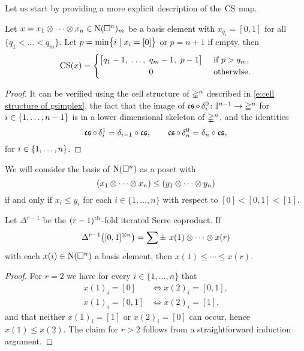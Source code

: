 Let us start by providing a more explicit description of the $\CS$ map.

\begin{lemma} \label{l:cs explicit}
	Let $x = x_1 \ot \cdots \ot x_n \in \chains(\cube^n)_m$ be a basis element with $x_{q_i} = [0,1]$ for all $\{q_1 < \dots < q_m\}$.
	Let $p = \min \set[\big]{i \mid x_i = [0]}$ or $p = n+1$ if empty, then
	\[
	\CS(x) =
	\begin{cases}
		\big[ q_1-1, \ \dots , \ q_m-1, \ p-1 \big] & \text{ if } p > q_m, \\
		\hfil 0 & \text{ otherwise}.
	\end{cases}
	\]
\end{lemma}

\begin{proof}
	It can be verified using the cell structure of $\gsimplex^n$ described in \cref{e:cell structure of gsimplex}, the fact that the image of $\cs \circ \, \delta^0_i \colon \gcube^{n-1} \to \gsimplex^n$ for $i \in \set{1,\dots,n-1}$ is in a lower dimensional skeleton of $\gsimplex^n$, and the identities
	\[
	\cs \circ \, \delta_i^1 = \delta_{i-1} \circ \cs,
	\qquad
	\cs \circ \, \delta_n^0 = \delta_n \circ \cs,
	\]
	for $i \in \set{1, \dots, n}$.
\end{proof}

We will consider the basis of $\chains(\cube^n)$ as a poset with
\[
(x_1 \ot \cdots \ot x_n) \leq (y_1 \ot \cdots \ot y_n)
\]
if and only if $x_i \leq y_i$ for each $i \in \{1, \dots, n\}$ with respect to $[0] < [0,1] < [1]$.

\begin{lemma}
	Let $\Delta^{r-1}$ be the $(r-1)^\th$-fold iterated Serre coproduct.
	If
	\[
	\Delta^{r-1} \big([0,1]^{\ot n}\big) =
	\sum \pm \ x{(1)} \ot \cdots \ot x{(r)}
	\]
	with each $x(i) \in \chains(\cube^n)$ a basis element, then $x{(1)} \leq \cdots \leq x{(r)}$.
\end{lemma}

\begin{proof}
	For $r = 2$ we have for every $i \in \{1, \dots, n\}$ that
	\begin{align*}
		x(1)_i = [0]   & \iff x(2)_i = [0,1], \\
		x(1)_i = [0,1] & \iff x(2)_i = [1],
	\end{align*}
	and that neither $x(1)_i = [1]$ or $x(2)_i = [0]$ can occur, hence $x(1) \leq x(2)$.
	The claim for $r > 2$ follows from a straightforward induction argument.
\end{proof}

